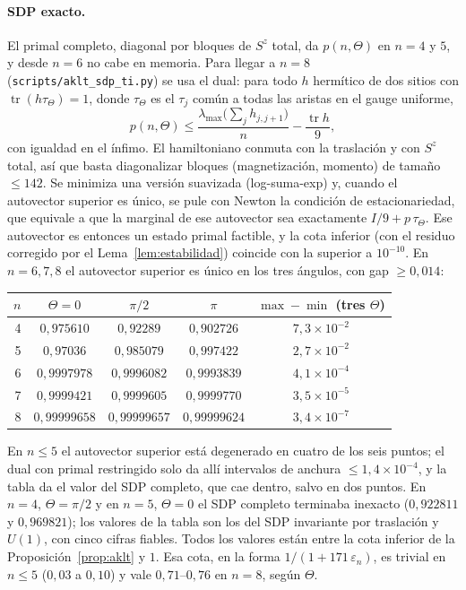 \documentclass[11pt,a4paper]{article}
\theoremstyle{remark}
\newcommand{\tr}{\operatorname{tr}}
\begin{document}
\paragraph{SDP exacto.} El primal completo, diagonal por bloques de $S^z$ total, da $p(n,\Theta)$
en $n=4$ y $5$, y desde $n=6$ no cabe en memoria. Para llegar a $n=8$
(\texttt{scripts/aklt\_sdp\_ti.py}) se usa el dual: para todo $h$ hermítico de dos sitios con
$\tr(h\tau_\Theta)=1$, donde $\tau_\Theta$ es el $\tau_j$ común a todas las aristas en el gauge
uniforme,
\[
  p(n,\Theta)\le\frac{\lambda_{\max}\big(\sum_jh_{j,j+1}\big)}n-\frac{\tr h}9,
\]
con igualdad en el ínfimo. El hamiltoniano conmuta con la traslación y con $S^z$ total, así que
basta diagonalizar bloques (magnetización, momento) de tamaño $\le142$. Se minimiza una versión
suavizada (log-suma-exp) y, cuando el autovector superior es único, se pule con Newton la condición
de estacionariedad, que equivale a que la marginal de ese autovector sea exactamente
$I/9+p\,\tau_\Theta$. Ese autovector es entonces un estado primal factible, y la cota inferior
(con el residuo corregido por el Lema~\ref{lem:estabilidad}) coincide con la superior a $10^{-10}$.
En $n=6,7,8$ el autovector superior es único en los tres ángulos, con gap $\ge0{,}014$:
\begin{center}\small
\begin{tabular}{rcccc}
\toprule
$n$ & $\Theta=0$ & $\pi/2$ & $\pi$ & $\max-\min$ (tres $\Theta$)\\
\midrule
4 & $0{,}975610$ & $0{,}92289$ & $0{,}902726$ & $7{,}3\times10^{-2}$\\
5 & $0{,}97036$ & $0{,}985079$ & $0{,}997422$ & $2{,}7\times10^{-2}$\\
6 & $0{,}9997978$ & $0{,}9996082$ & $0{,}9993839$ & $4{,}1\times10^{-4}$\\
7 & $0{,}9999421$ & $0{,}9999605$ & $0{,}9999770$ & $3{,}5\times10^{-5}$\\
8 & $0{,}99999658$ & $0{,}99999657$ & $0{,}99999624$ & $3{,}4\times10^{-7}$\\
\bottomrule
\end{tabular}
\end{center}
En $n\le5$ el autovector superior está degenerado en
cuatro de los seis puntos; el dual con primal restringido solo da allí intervalos de anchura
$\le1{,}4\times10^{-4}$, y la tabla da el valor del SDP completo, que cae dentro, salvo en dos puntos. En $n=4$,
$\Theta=\pi/2$ y en $n=5$, $\Theta=0$ el SDP completo terminaba inexacto ($0{,}922811$ y
$0{,}969821$); los valores de la tabla son los del SDP invariante por traslación y $U(1)$, con
cinco cifras fiables. Todos los valores están entre la cota inferior de la
Proposición~\ref{prop:aklt} y $1$. Esa cota, en la forma $1/(1+171\,\varepsilon_n)$, es trivial en
$n\le5$ ($0{,}03$ a $0{,}10$) y vale $0{,}71$--$0{,}76$ en $n=8$, según $\Theta$.
\end{document}

